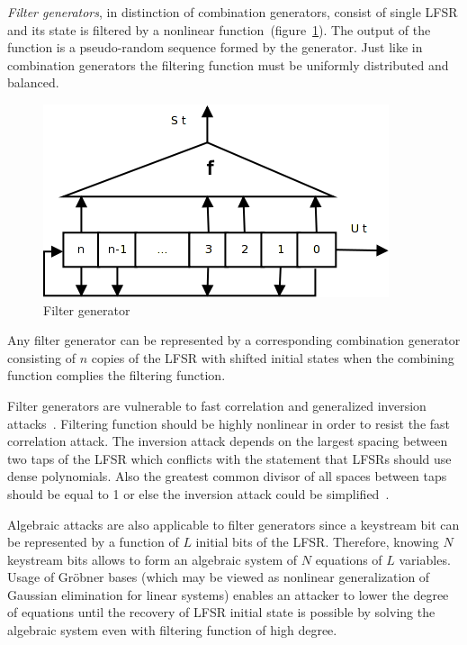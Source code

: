 \textit{Filter generators}, in distinction of combination generators, consist of
single LFSR and its state is filtered by a nonlinear
function~(figure~\ref{fig:filter-gen}). The output of the function is a
pseudo-random sequence formed by the generator. Just like in combination
generators the filtering function must be uniformly distributed and balanced.
\begin{figure}[htbp]
    \centering
    \includegraphics[scale=0.5]{images/filter-gen}
    \caption{Filter generator}
    \label{fig:filter-gen}
\end{figure}

Any filter generator can be represented by a corresponding combination generator
consisting of $n$ copies of the LFSR with shifted initial states when the
combining function complies the filtering function.

Filter generators are vulnerable to fast correlation and generalized inversion
attacks~\cite{canteaut:invattack}. Filtering function should be highly nonlinear
in order to resist the fast correlation attack. The inversion attack depends on
the largest spacing between two taps of the LFSR which conflicts with the
statement that LFSRs should use dense polynomials. Also the greatest common
divisor of all spaces between taps should be equal to 1 or else the inversion
attack could be simplified~\cite{encyclopedia_of_cryptography}.

Algebraic attacks are also applicable to filter generators since a keystream
bit can be represented by a function of $L$ initial bits of the LFSR. Therefore,
knowing $N$ keystream bits allows to form an algebraic system of $N$ equations
of $L$ variables. Usage of Gr\"obner bases (which may be viewed as nonlinear
generalization of Gaussian elimination for linear systems) enables an attacker
to lower the degree of equations until the recovery of LFSR initial state is
possible by solving the algebraic system even with filtering function of high
degree.

